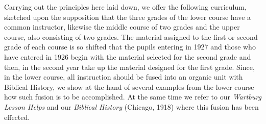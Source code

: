Carrying out the principles here laid down, we offer the following curriculum, sketched upon the supposition that the three grades of the lower course have a common instructor, likewise the middle course of two grades and the upper course, also consisting of two grades. The material assigned to the first or second grade of each course is so shifted that the pupils entering in 1927 and those who have entered in 1926 begin with the material selected for the second grade and then, in the second year take up the material designed for the first grade. Since, in the lower course, all instruction should be fused into an organic unit with Biblical History, we show at the hand of several examples from the lower course how such fusion is to be accomplished. At the same time we refer to our \emph{Wartburg Lesson Helps} and our \emph{Biblical History} (Chicago, 1918) where this fusion has been effected.

